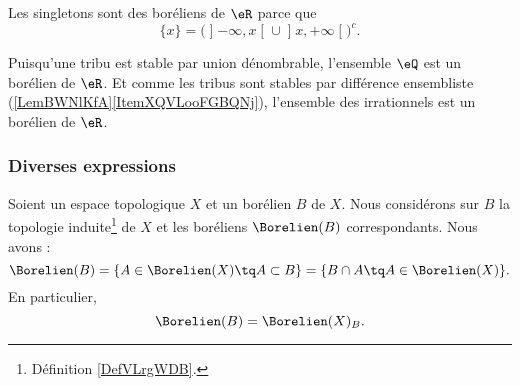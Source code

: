 \begin{example}
	Les singletons sont des boréliens de \( \eR\) parce que
	\begin{equation}
		\{ x \}=\Big( \mathopen] -\infty , x \mathclose[\cup\mathopen] x , +\infty \mathclose[ \Big)^c.
	\end{equation}

	Puisqu'une tribu est stable par union dénombrable, l'ensemble \( \eQ\) est un borélien de \( \eR\). Et comme les tribus sont stables par différence ensembliste (\ref{LemBWNlKfA}\ref{ItemXQVLooFGBQNj}), l'ensemble des irrationnels est un borélien de \( \eR\).
\end{example}

\subsubsection{Diverses expressions}

\begin{lemma}   \label{LEMooUPYDooPVjscA}
	Soient un espace topologique \( X\) et un borélien \( B\) de \( X\). Nous considérons sur \( B\) la topologie induite\footnote{Définition \ref{DefVLrgWDB}.} de \( X\) et les boréliens \( \Borelien(B)\) correspondants. Nous avons :
	\begin{equation}
		\Borelien(B)=\{ A\in \Borelien(X)\tq A\subset B \}=\{ B\cap A\tq A\in \Borelien(X) \}.
	\end{equation}
	En particulier,
	\begin{equation}    \label{EQooEUWVooCBUims}
		\Borelien(B)=\Borelien(X)_B.
	\end{equation}
\end{lemma}

